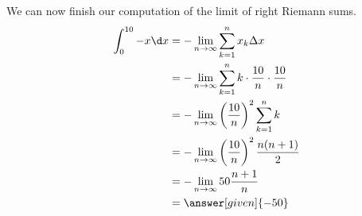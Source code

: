 \documentclass{ximera}
\begin{document}
\begin{example}
\begin{explanation}
\begin{enumerate}
We can now finish our computation of the limit of right Riemann sums.
\begin{align*}
\int_0^{10}-x \d x&=-\lim_{n\to\infty}\sum_{k=1}^n x_k\Delta x\\
&=-\lim_{n\to\infty}\sum_{k=1}^n k\cdot\frac{10}{n}\cdot\frac{10}{n}\\
&=-\lim_{n\to\infty}\left(\frac{10}{n}\right)^2\sum_{k=1}^n k\\
&=-\lim_{n\to\infty}\left(\frac{10}{n}\right)^2\frac{n(n+1)}{2}\\
&=-\lim_{n\to\infty}50\frac{n+1}{n}\\
&=\answer[given]{-50}\\
\end{align*}
\end{enumerate}
\end{explanation}
\end{example}
\end{document}
